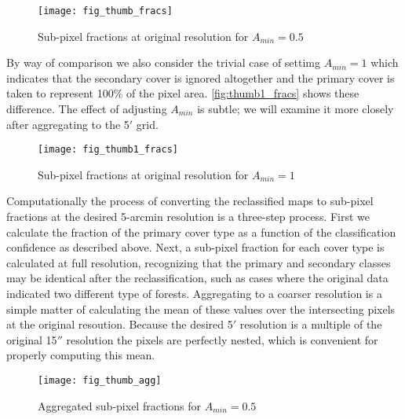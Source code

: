 

\begin{figure}[hpt] 
\begin{center}
  

\texttt{[image: fig\_thumb\_fracs]}
\end{center} 
\caption{Sub-pixel fractions at original resolution for $A_{min}=0.5$}
\label{fig:thumb_fracs}
\end{figure} 

By way of comparison we also consider the trivial case of settimg
$A_{min} = 1$ which indicates that the secondary cover is ignored
altogether and the primary cover is taken to represent 100\% of the
pixel area.  \autoref{fig:thumb1_fracs} shows these difference.  The
effect of adjusting $A_{min}$ is subtle; we will examine it more
closely after aggregating to the 5$'$ grid.

\begin{figure}[hpt] 
\begin{center}
  

\texttt{[image: fig\_thumb1\_fracs]}
\end{center} 
\caption{Sub-pixel fractions at original resolution for $A_{min}=1$}
\label{fig:thumb1_fracs}
\end{figure} 

Computationally the process of converting the reclassified maps to
sub-pixel fractions at the desired 5-arcmin resolution is a three-step
process.  First we calculate the fraction of the primary cover type as
a function of the classification confidence as described above.  Next,
a sub-pixel fraction for each cover type is calculated at full
resolution, recognizing that the primary and secondary classes may be
identical after the reclassification, such as cases where the original
data indicated two different type of forests.  Aggregating to a
coarser resolution is a simple matter of calculating the mean of these
values over the intersecting pixels at the original resoution.
Because the desired 5$'$ resolution is a multiple of the original
15$''$ resolution the pixels are perfectly nested, which is
convenient for properly computing this mean.


\begin{figure}[hpt] 
\begin{center}
  

\texttt{[image: fig\_thumb\_agg]}
\end{center} 
\caption{Aggregated sub-pixel fractions for $A_{min}=0.5$}
\label{fig:thumb_agg}
\end{figure} 

